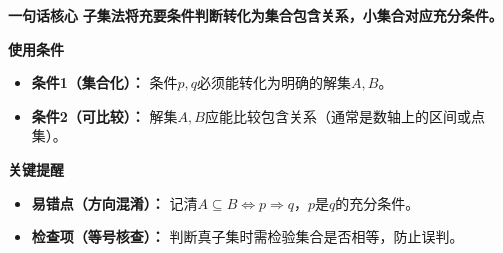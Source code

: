 \begin{summarybox}
	\textbf{\textcolor{CSummary}{一句话核心}}
	\textbf{子集法将充要条件判断转化为集合包含关系，小集合对应充分条件。}

	\medskip
	\textbf{\textcolor{CSummary}{使用条件}}
	\begin{itemize}[leftmargin=*, itemsep=0.5em, topsep=0.4em]
		\item \textbf{条件1（集合化）：} 条件$p,q$必须能转化为明确的解集$A,B$。
		\item \textbf{条件2（可比较）：} 解集$A,B$应能比较包含关系（通常是数轴上的区间或点集）。
	\end{itemize}

	\medskip
	\textbf{\textcolor{CSummary}{关键提醒}}
	\begin{itemize}[leftmargin=*, itemsep=0.5em, topsep=0.4em]
		\item \textbf{易错点（方向混淆）：} 记清$A\subseteq B\Leftrightarrow p\Rightarrow q$，$p$是$q$的充分条件。
		\item \textbf{检查项（等号核查）：} 判断真子集时需检验集合是否相等，防止误判。
	\end{itemize}

\end{summarybox}

